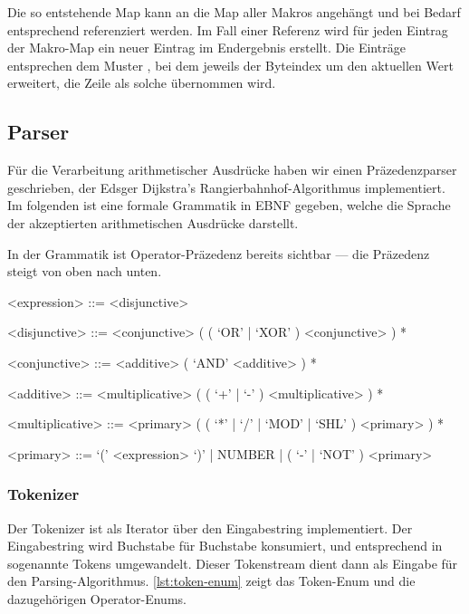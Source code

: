 
Die so entstehende Map kann an die Map aller Makros angehängt und bei Bedarf entsprechend referenziert werden. Im Fall einer Referenz wird für jeden Eintrag der Makro-Map ein neuer Eintrag im Endergebnis erstellt. Die Einträge entsprechen dem Muster , bei dem jeweils der Byteindex um den aktuellen Wert erweitert, die Zeile als solche übernommen wird.

\subsection{Parser}

Für die Verarbeitung arithmetischer Ausdrücke haben wir einen Präzedenzparser geschrieben, der Edsger Dijkstra's Rangierbahnhof-Algorithmus implementiert. Im folgenden ist eine formale Grammatik in \ac{EBNF} gegeben, welche die Sprache der akzeptierten arithmetischen Ausdrücke darstellt.

In der Grammatik ist Operator-Präzedenz bereits sichtbar --- die Präzedenz steigt von oben nach unten.

\begin{grammar}

<expression> ::= <disjunctive>

<disjunctive> ::= <conjunctive> ( ( `OR' | `XOR' ) <conjunctive> ) *

<conjunctive> ::= <additive> ( `AND' <additive> ) *

<additive> ::= <multiplicative> ( ( `+' | `-' ) <multiplicative> ) *

<multiplicative> ::= <primary> ( ( `*' | `/' | `MOD' | `SHL' ) <primary> ) *

<primary> ::= `(' <expression> `)' | NUMBER | ( `-' | `NOT' ) <primary>

\end{grammar}

\subsubsection{Tokenizer}

Der Tokenizer ist als Iterator über den Eingabestring implementiert. Der Eingabestring wird Buchstabe für Buchstabe konsumiert, und entsprechend in sogenannte Tokens umgewandelt. Dieser Tokenstream dient dann als Eingabe für den Parsing-Algorithmus.
\cref{lst:token-enum} zeigt das Token-Enum und die dazugehörigen Operator-Enums.

